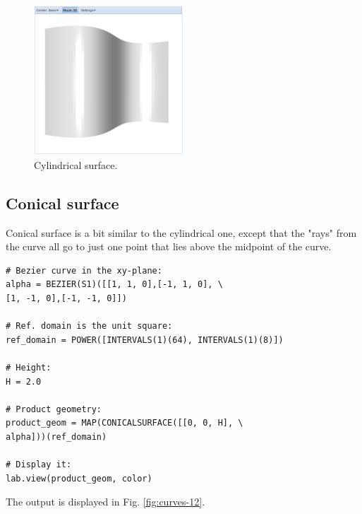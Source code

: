 \documentclass{article}
\begin{document}
\begin{figure}[!ht]
\begin{center}
\includegraphics[width=0.5\textwidth]{img/curves-11.png}
\end{center}
\vspace{-2mm}
\caption{Cylindrical surface.}
\label{fig:curves-11}
\end{figure}


\subsection{Conical surface}

Conical surface is a bit similar to the cylindrical one, 
except that the "rays" from the curve all go to just one
point that lies above the midpoint of the curve.

\begin{verbatim}
# Bezier curve in the xy-plane:
alpha = BEZIER(S1)([[1, 1, 0],[-1, 1, 0], \
[1, -1, 0],[-1, -1, 0]])

# Ref. domain is the unit square:
ref_domain = POWER([INTERVALS(1)(64), INTERVALS(1)(8)])

# Height:
H = 2.0

# Product geometry:
product_geom = MAP(CONICALSURFACE([[0, 0, H], \
alpha]))(ref_domain)

# Display it:
lab.view(product_geom, color)
\end{verbatim}
The output is displayed in Fig. \ref{fig:curves-12}.
\end{document}
